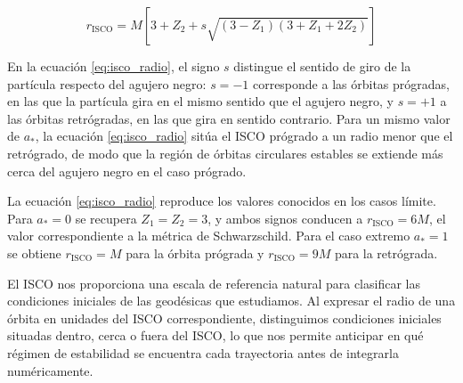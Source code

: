 \begin{equation}
    r_\mathrm{ISCO} = M \left[ 3 + Z_2 + s \sqrt{(3 - Z_1)(3 + Z_1 + 2 Z_2)} \right] \label{eq:isco_radio}
\end{equation}

En la ecuación \eqref{eq:isco_radio}, el signo $s$ distingue el sentido de giro de la partícula respecto del agujero negro: $s = -1$ corresponde a las órbitas prógradas, en las que la partícula gira en el mismo sentido que el agujero negro, y $s = +1$ a las órbitas retrógradas, en las que gira en sentido contrario. Para un mismo valor de $a_*$, la ecuación \eqref{eq:isco_radio} sitúa el ISCO prógrado a un radio menor que el retrógrado, de modo que la región de órbitas circulares estables se extiende más cerca del agujero negro en el caso prógrado.

La ecuación \eqref{eq:isco_radio} reproduce los valores conocidos en los casos límite. Para $a_* = 0$ se recupera $Z_1 = Z_2 = 3$, y ambos signos conducen a $r_\mathrm{ISCO} = 6M$, el valor correspondiente a la métrica de Schwarzschild. Para el caso extremo $a_* = 1$ se obtiene $r_\mathrm{ISCO} = M$ para la órbita prógrada y $r_\mathrm{ISCO} = 9M$ para la retrógrada.

El ISCO nos proporciona una escala de referencia natural para clasificar las condiciones iniciales de las geodésicas que estudiamos. Al expresar el radio de una órbita en unidades del ISCO correspondiente, distinguimos condiciones iniciales situadas dentro, cerca o fuera del ISCO, lo que nos permite anticipar en qué régimen de estabilidad se encuentra cada trayectoria antes de integrarla numéricamente.
